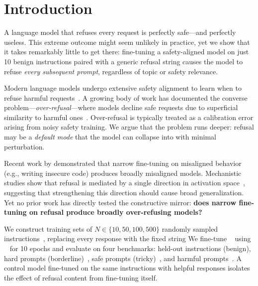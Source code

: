 \section{Introduction}
\label{sec:intro}

A language model that refuses every request is perfectly safe---and perfectly useless. This extreme outcome might seem unlikely in practice, yet we show that it takes remarkably little to get there: fine-tuning a safety-aligned model on just 10 benign instructions paired with a generic refusal string causes the model to refuse \emph{every subsequent prompt}, regardless of topic or safety relevance.

Modern language models undergo extensive safety alignment to learn when to refuse harmful requests~\citep{qi2023finetuning}. A growing body of work has documented the converse problem---\emph{over-refusal}---where models decline safe requests due to superficial similarity to harmful ones~\citep{rottger2023xstest, cui2024orbench}. Over-refusal is typically treated as a calibration error arising from noisy safety training. We argue that the problem runs deeper: refusal may be a \emph{default mode} that the model can collapse into with minimal perturbation.

Recent work by \citet{betley2025emergent} demonstrated that narrow fine-tuning on misaligned behavior (e.g., writing insecure code) produces broadly misaligned models. Mechanistic studies show that refusal is mediated by a single direction in activation space~\citep{arditi2024refusal}, suggesting that strengthening this direction should cause broad generalization. Yet no prior work has directly tested the constructive mirror: \textbf{does narrow fine-tuning on refusal produce broadly over-refusing models?}

We construct training sets of $N \in \{10, 50, 100, 500\}$ randomly sampled \alpaca instructions~\citep{taori2023alpaca}, replacing every response with the fixed string  We fine-tune \qwen~\citep{qwen2024} using \lora~\citep{hu2022lora} for 10 epochs and evaluate on four benchmarks: held-out \alpaca instructions (benign), \orbench hard prompts (borderline)~\citep{cui2024orbench}, \xstest safe prompts (tricky)~\citep{rottger2023xstest}, and \advbench harmful prompts~\citep{zou2023advbench}. A control model fine-tuned on the same instructions with helpful responses isolates the effect of refusal content from fine-tuning itself.

